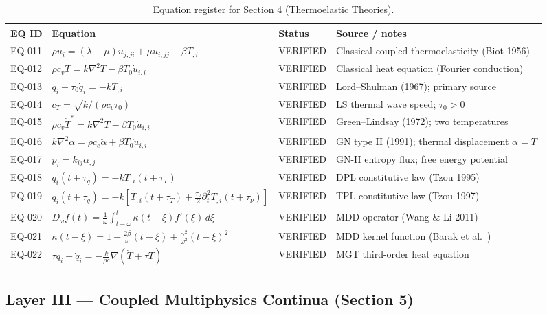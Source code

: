 \begin{table}[h]
\centering
\small
\caption{Equation register for Section 4 (Thermoelastic Theories).}
\label{tab:appA-sec4}
\begin{tabularx}{\textwidth}{@{}lXll@{}}
\toprule
\textbf{EQ ID} & \textbf{Equation} & \textbf{Status} & \textbf{Source / notes} \\
\midrule
EQ-011 & $\rho\ddot{u}_i = (\lambda+\mu)u_{j,ji} + \mu u_{i,jj} - \beta T_{,i}$ & VERIFIED & Classical coupled thermoelasticity (Biot 1956) \\
EQ-012 & $\rho c_v \dot{T} = k\nabla^2 T - \beta T_0 \dot{u}_{i,i}$ & VERIFIED & Classical heat equation (Fourier conduction) \\
EQ-013 & $q_i + \tau_0\dot{q}_i = -kT_{,i}$ & VERIFIED & Lord--Shulman (1967); primary source \\
EQ-014 & $c_T = \sqrt{k/(\rho c_v\tau_0)}$ & VERIFIED & LS thermal wave speed; $\tau_0 > 0$ \\
EQ-015 & $\rho c_v\dot{T}^* = k\nabla^2 T - \beta T_0\dot{u}_{i,i}$ & VERIFIED & Green--Lindsay (1972); two temperatures \\
EQ-016 & $k\nabla^2\alpha = \rho c_e\ddot{\alpha} + \beta T_0\ddot{u}_{i,i}$ & VERIFIED & GN type II (1991); thermal displacement $\dot{\alpha}=T$ \\
EQ-017 & $p_i = k_{ij}\alpha_{,j}$ & VERIFIED & GN-II entropy flux; free energy potential \\
EQ-018 & $q_i(t+\tau_q) = -kT_{,i}(t+\tau_T)$ & VERIFIED & DPL constitutive law (Tzou 1995) \\
EQ-019 & $q_i(t+\tau_q) = -k[T_{,i}(t+\tau_T) + \tfrac{\tau_\nu}{2}\partial_t^2 T_{,i}(t+\tau_\nu)]$ & VERIFIED & TPL constitutive law (Tzou 1997) \\
EQ-020 & $D_\omega f(t) = \tfrac{1}{\omega}\int_{t-\omega}^{t}\kappa(t-\xi)f'(\xi)\,d\xi$ & VERIFIED & MDD operator (Wang \& Li 2011) \\
EQ-021 & $\kappa(t-\xi) = 1 - \tfrac{2\beta}{\omega}(t-\xi) + \tfrac{\alpha^2}{\omega^2}(t-\xi)^2$ & VERIFIED & MDD kernel function (Barak et al.~\cite{Barak2023}) \\
EQ-022 & $\tau\ddot{q}_i + \dot{q}_i = -\tfrac{k}{\rho c}\nabla(\dot{T} + \tau\ddot{T})$ & VERIFIED & MGT third-order heat equation \\
\bottomrule
\end{tabularx}
\end{table}

\subsection{Layer III — Coupled Multiphysics Continua (Section 5)}


